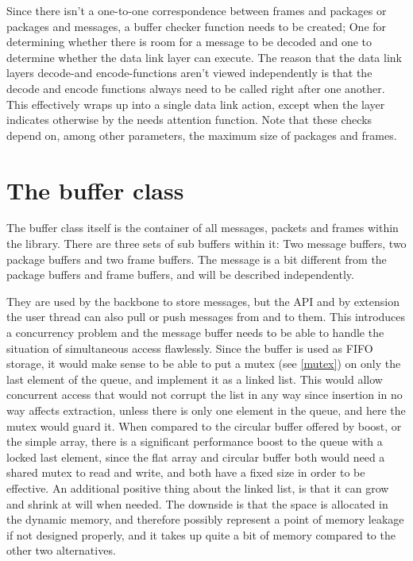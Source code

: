 Since there isn't a one-to-one correspondence between frames and packages or packages and messages, a buffer checker function needs to be created; One for determining whether there is room for a message to be decoded and one to determine whether the data link layer can execute. The reason that the data link layers decode-and encode-functions aren't viewed independently is that the decode and encode functions always need to be called right after one another. This effectively wraps up into a single data link action, except when the layer indicates otherwise by the needs attention function.
Note that these checks depend on, among other parameters, the maximum size of packages and frames.





\section{The buffer class}
\label{bufferclass}
The buffer class itself is the container of all messages, packets and frames within the library. There are three sets of sub buffers within it: Two message buffers, two package buffers and two frame buffers. 
The message is a bit different from the package buffers and frame buffers, and will be described independently. 

They are used by the backbone to store messages, but the API and by extension the user thread can also pull or push messages from and to them. This introduces a concurrency problem and the message buffer needs to be able to handle the situation of simultaneous access flawlessly.
Since the buffer is used as FIFO storage, it would make sense to be able to put a mutex (see \ref{mutex}) on only the last element of the queue, and implement it as a linked list.
This would allow concurrent access that would not corrupt the list in any way since insertion in no way affects extraction, unless there is only one element in the queue, and here the mutex would guard it.
When compared to the circular buffer offered by boost, or the simple array, there is a significant performance boost to the queue with a locked last element, since the flat array and circular buffer both would need a shared mutex to read and write, and both have a fixed size in order to be effective.
An additional positive thing about the linked list, is that it can grow and shrink at will when needed. The downside is that the space is allocated in the dynamic memory, and therefore possibly represent a point of memory leakage if not designed properly, and it takes up quite a bit of memory compared to the other two alternatives.

